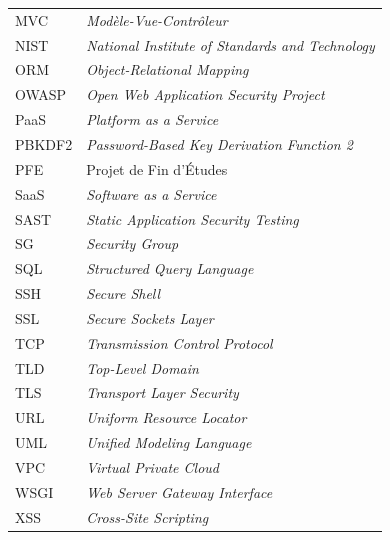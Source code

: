 \begin{longtable}{p{3cm} p{12cm}}
MVC  & \textit{Modèle-Vue-Contrôleur} \\
NIST & \textit{National Institute of Standards and Technology} \\
ORM  & \textit{Object-Relational Mapping} \\
OWASP & \textit{Open Web Application Security Project} \\
PaaS & \textit{Platform as a Service} \\
PBKDF2 & \textit{Password-Based Key Derivation Function 2} \\
PFE  & Projet de Fin d'Études \\
SaaS & \textit{Software as a Service} \\
SAST & \textit{Static Application Security Testing} \\
SG   & \textit{Security Group} \\
SQL  & \textit{Structured Query Language} \\
SSH  & \textit{Secure Shell} \\
SSL  & \textit{Secure Sockets Layer} \\
TCP  & \textit{Transmission Control Protocol} \\
TLD  & \textit{Top-Level Domain} \\
TLS  & \textit{Transport Layer Security} \\
URL  & \textit{Uniform Resource Locator} \\
UML  & \textit{Unified Modeling Language} \\
VPC  & \textit{Virtual Private Cloud} \\
WSGI & \textit{Web Server Gateway Interface} \\
XSS  & \textit{Cross-Site Scripting} \\
\bottomrule
\end{longtable}
